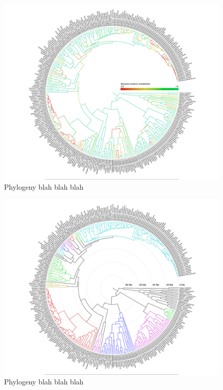 \documentclass[review]{elsarticle}
\begin{document}
\begin{figure}[t]
    \centering
    \includegraphics[width=1.0\textwidth, trim=0 10 0 0, clip=true]{colored_posterior}
    \caption{Phylogeny blah blah blah}
    \label{posteriors}
\end{figure}

\begin{figure}[t]
    \centering
    \includegraphics[width=1.0\textwidth, trim=0 10 0 0, clip=true]{time_colored_genera}
    \caption{Phylogeny blah blah blah}
    \label{genera}
\end{figure}
\end{document}
